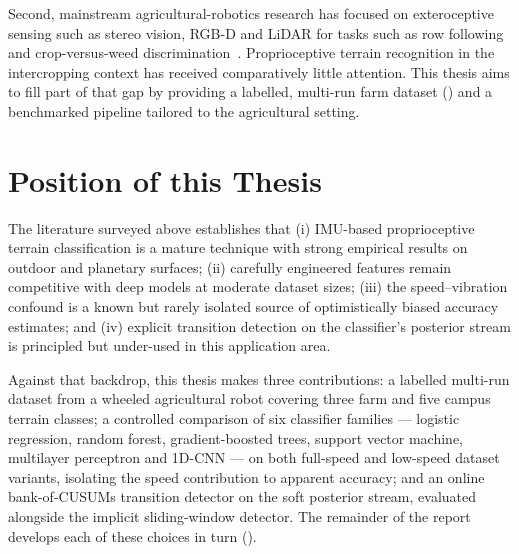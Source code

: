 Second, mainstream agricultural-robotics research has focused on exteroceptive sensing such as stereo vision, RGB-D and LiDAR for tasks such as row following and crop-versus-weed discrimination~\cite{Reina2016}. Proprioceptive terrain recognition in the intercropping context has received comparatively little attention. This thesis aims to fill part of that gap by providing a labelled, multi-run farm dataset () and a benchmarked pipeline tailored to the agricultural setting.

\section{Position of this Thesis}
\label{sec:bg-summary}

The literature surveyed above establishes that (i) IMU-based proprioceptive terrain classification is a mature technique with strong empirical results on outdoor and planetary surfaces; (ii) carefully engineered features remain competitive with deep models at moderate dataset sizes; (iii) the speed--vibration confound is a known but rarely isolated source of optimistically biased accuracy estimates; and (iv) explicit transition detection on the classifier's posterior stream is principled but under-used in this application area.

Against that backdrop, this thesis makes three contributions: a labelled multi-run dataset from a wheeled agricultural robot covering three farm and five campus terrain classes; a controlled comparison of six classifier families --- logistic regression, random forest, gradient-boosted trees, support vector machine, multilayer perceptron and 1D-CNN --- on both full-speed and low-speed dataset variants, isolating the speed contribution to apparent accuracy; and an online bank-of-CUSUMs transition detector on the soft posterior stream, evaluated alongside the implicit sliding-window detector. The remainder of the report develops each of these choices in turn ().